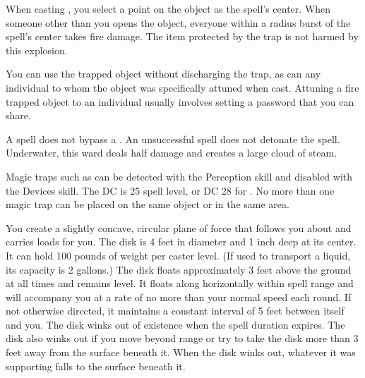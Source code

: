 \begin{spelleffect}
When casting , you select a point on the object as the spell's center. When someone other than you opens the object, everyone within a \areasmall radius burst of the spell's center takes fire damage. The item protected by the trap is not harmed by this explosion.
\par You can use the trapped object without discharging the trap, as can any individual to whom the object was specifically attuned when cast. Attuning a fire trapped object to an individual usually involves setting a password that you can share.
\end{spelleffect}
\begin{spellnotes}
A  spell does not bypass a . An unsuccessful  spell does not detonate the spell. Underwater, this ward deals half damage and creates a large cloud of steam.
\par Magic traps such as  can be detected with the Perception skill and disabled with the Devices skill. The DC is 25 \add spell level, or DC 28 for . No more than one magic trap can be placed on the same object or in the same area.
\end{spellnotes}

\spellrng{\rngmed}
\begin{spelleffect}
You create a slightly concave, circular plane of force that follows you about and carries loads for you. The disk is 4 feet in diameter and 1 inch deep at its center. It can hold 100 pounds of weight per caster level. (If used to transport a liquid, its capacity is 2 gallons.) The disk floats approximately 3 feet above the ground at all times and remains level. It floats along horizontally within spell range and will accompany you at a rate of no more than your normal speed each round. If not otherwise directed, it maintains a constant interval of 5 feet between itself and you. The disk winks out of existence when the spell duration expires. The disk also winks out if you move beyond range or try to take the disk more than 3 feet away from the surface beneath it. When the disk winks out, whatever it was supporting falls to the surface beneath it.
\end{spelleffect}

